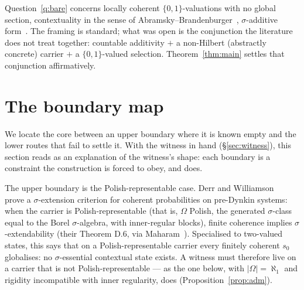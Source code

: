 \begin{remark}\label{rem:sheaf}
Question~\ref{q:bare} concerns locally coherent $\{0,1\}$-valuations with no
global section, contextuality in the sense of
Abramsky--Brandenburger~\cite{AbramskyBrandenburger2011}, $\sigma$-additive
form~\cite{AbramskyBarbosaEtAl2022}. The framing is standard; what was open is the
conjunction the literature does not treat together: countable additivity $+$ a
non-Hilbert (abstractly concrete) carrier $+$ a $\{0,1\}$-valued selection.
Theorem~\ref{thm:main} settles that conjunction affirmatively.
\end{remark}


\section{The boundary map}\label{sec:boundary}

We locate the core between an upper boundary where it is known empty and the
lower routes that fail to settle it. With the witness in hand
(\S\ref{sec:witness}), this section reads as an explanation of the witness's
shape: each boundary is a constraint the construction is forced to obey, and
does.

The upper boundary is the Polish-representable case. Derr and
Williamson~\cite{DerrWilliamson2023} prove a $\sigma$-extension criterion for
coherent probabilities on pre-Dynkin systems: when the carrier is
Polish-representable (that is, $\Omega$ Polish, the generated $\sigma$-class
equal to the Borel $\sigma$-algebra, with inner-regular blocks), finite coherence
implies $\sigma$-extendability (their Theorem D.6, via
Maharam~\cite{Maharam1972}). Specialised to two-valued states, this says that on
a Polish-representable carrier every finitely coherent $s_0$ globalises: no
$\sigma$-essential contextual state exists. A witness must therefore live on a
carrier that is not Polish-representable --- as the one below, with
$|\Omega|=\aleph_1$ and rigidity incompatible with inner regularity, does
(Proposition~\ref{prop:adm}).

